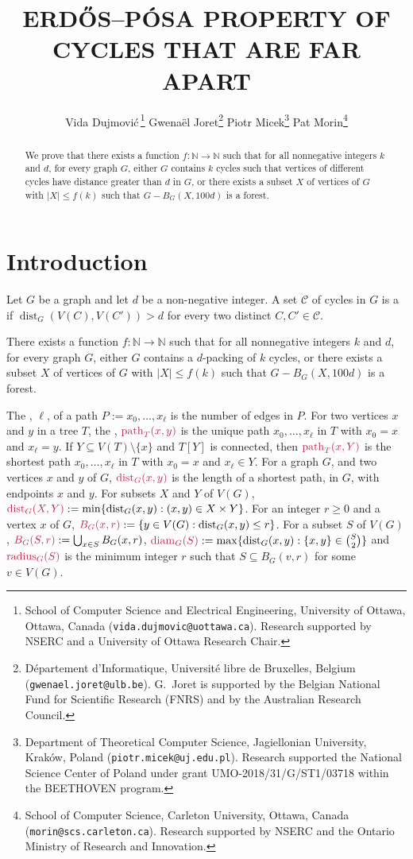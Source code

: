 \documentclass{patmorin}
\title{\MakeUppercase{{E}rdős–{P}ósa property of cycles that are far apart}}
\author{
 Vida Dujmovi{\'c}\,\footnote{School of Computer Science and Electrical Engineering, University of Ottawa, Ottawa, Canada (\texttt{vida.dujmovic@uottawa.ca}). Research supported by NSERC and a University of Ottawa Research Chair.}
 \qquad
 Gwena\"el Joret\footnote{D\'epartement d'Informatique, Universit\'e libre de Bruxelles, Belgium ({\tt gwenael.joret@ulb.be}). G.\ Joret is supported by the Belgian National Fund for Scientific Research (FNRS) and by the Australian Research Council.}
 \qquad
 Piotr Micek\footnote{Department of Theoretical Computer Science, Jagiellonian University, Kraków, Poland (\texttt{piotr.micek@uj.edu.pl}). Research supported
 the National Science Center of Poland under grant UMO-2018/31/G/ST1/03718 within the BEETHOVEN program.}
 \qquad
 Pat Morin\footnote{School of Computer Science, Carleton University, Ottawa, Canada (\texttt{morin@scs.carleton.ca}). Research supported by NSERC and the Ontario Ministry of Research and Innovation.}}
\date{}
\DeclareMathOperator{\diam}{diam}
\DeclareMathOperator{\radius}{radius}
\DeclareMathOperator{\pth}{path}
\DeclareMathOperator{\dist}{dist}
\begin{document}
\maketitle

\begin{abstract}
  We prove that there exists a function $f:\mathbb{N}\to\mathbb{N}$ such that for all nonnegative integers $k$ and $d$,  for every graph $G$,  either $G$ contains $k$ cycles such that vertices of different cycles have distance greater than $d$ in $G$, or there exists a subset $X$ of vertices of $G$ with $|X|\leq f(k)$ such that  $G-B_G(X,100d)$ is a forest.
\end{abstract}

\section{Introduction}

Let $G$ be a graph and let $d$ be a non-negative integer.
A set $\mathcal{C}$ of cycles in $G$ is a  if $\dist_G(V(C),V(C'))> d$ for every two distinct $C,C'\in\mathcal{C}$.


\begin{thm}\label{thm:main-in-intro}
  There exists a function $f:\mathbb{N}\to\mathbb{N}$ such that for all nonnegative integers $k$ and $d$,  for every graph $G$,  either $G$ contains a $d$-packing of $k$ cycles, or  there exists a subset $X$ of vertices of $G$ with $|X|\leq f(k)$ such that  $G-B_G(X,100d)$ is a forest.
\end{thm}


The , $\ell$, of a path $P:=x_0,\ldots,x_\ell$ is the number of edges in $P$.  For two vertices $x$ and $y$ in a  tree $T$, the , $\mathdefin{\pth_T(x,y)}$ is the unique path $x_0,\ldots,x_\ell$ in $T$ with $x_0=x$ and $x_\ell=y$. If $Y\subseteq V(T)\setminus\{x\}$ and $T[Y]$ is connected, then $\mathdefin{\pth_T(x,Y)}$ is the shortest path $x_0,\ldots,x_{\ell}$ in $T$ with $x_0=x$ and $x_\ell\in Y$.  For a graph $G$, and two vertices $x$ and $y$ of $G$, $\mathdefin{\dist_G(x,y)}$ is the length of a shortest path, in $G$, with endpoints $x$ and $y$.  For subsets $X$ and $Y$ of $V(G)$, $\mathdefin{\dist_G(X,Y)}:=\min\{\dist_G(x,y):(x,y)\in X\times Y\}$.  For an integer $r\ge 0$ and a vertex $x$ of $G$, $\mathdefin{B_G(x,r)}:=\{y\in V(G):\dist_G(x,y)\le r\}$.  For a subset $S$ of $V(G)$, $\mathdefin{B_G(S,r)}:=\bigcup_{x\in S}B_G(x,r)$, $\mathdefin{\diam_G(S)}:=\max\{\dist_G(x,y):\{x,y\}\in\binom{S}{2}\}$ and $\mathdefin{\radius_G(S)}$ is the minimum integer $r$ such that $S\subseteq B_G(v,r)$ for some $v\in V(G)$.
\end{document}
